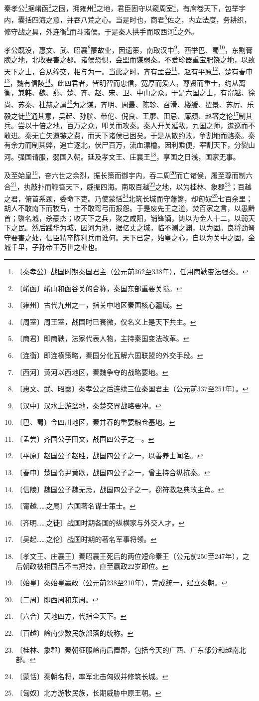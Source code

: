 \documentclass[12pt,UTF-8,openany]{ctexbook}
\begin{document}
\begin{normalsize}
    
    秦孝公\footnote{〔秦孝公〕战国时期秦国君主（公元前362至338年），任用商鞅变法强秦。}据崤函\footnote{〔崤函〕崤山和函谷关的合称，秦国东部重要关隘。}之固，拥雍州\footnote{〔雍州〕古代九州之一，指关中地区秦国核心疆域。}之地，君臣固守以窥周室\footnote{〔周室〕周王室，战国时已衰微，仅名义上是天下共主。}，有席卷天下，包举宇内，囊括四海之意，并吞八荒之心。当是时也，商君\footnote{〔商君〕即商鞅，法家代表人物，主持秦国变法改革。}佐之，内立法度，务耕织，修守战之具，外连衡\footnote{〔连衡〕即连横策略，秦国分化瓦解六国联盟的外交手段。}而斗诸侯。于是秦人拱手而取西河\footnote{〔西河〕黄河以西地区，秦魏争夺的战略要地。}之外。
    
    孝公既没，惠文、武、昭襄\footnote{〔惠文、武、昭襄〕秦孝公之后连续三位秦国君主（公元前337至251年）。}蒙故业，因遗策，南取汉中\footnote{〔汉中〕汉水上游盆地，秦楚交界战略要冲。}，西举巴、蜀\footnote{〔巴、蜀〕今四川地区，秦并吞的重要粮仓基地。}，东割膏腴之地，北收要害之郡。诸侯恐惧，会盟而谋弱秦。不爱珍器重宝肥饶之地，以致天下之士，合从缔交，相与为一。当此之时，齐有孟尝\footnote{〔孟尝〕齐国公子田文，战国四公子之一。}，赵有平原\footnote{〔平原〕赵国公子赵胜，战国四公子之一，以善养士闻名。}，楚有春申\footnote{〔春申〕楚国令尹黄歇，战国四公子之一，曾主持合纵抗秦。}，魏有信陵\footnote{〔信陵〕魏国公子魏无忌，战国四公子之一，窃符救赵典故主角。}。此四君者，皆明智而忠信，宽厚而爱人，尊贤而重士，约从离衡，兼韩、魏、燕、楚、齐、赵、宋、卫、中山之众。于是六国之士，有甯越、徐尚、苏秦、杜赫之属\footnote{〔甯越……之属〕六国著名谋士策士。}为之谋，齐明、周最、陈轸、召滑、楼缓、翟景、苏厉、乐毅之徒\footnote{〔齐明……之徒〕战国时期各国的纵横家与外交人才。}通其意，吴起、孙膑、带佗、倪良、王廖、田忌、廉颇、赵奢之伦\footnote{〔吴起……之伦〕战国时期的著名军事将领。}制其兵。尝以十倍之地，百万之众，叩关而攻秦。秦人开关延敌，九国之师，逡巡而不敢进。秦无亡矢遗镞之费，而天下诸侯已困矣。于是从散约败，争割地而赂秦。秦有余力而制其弊，追亡逐北，伏尸百万，流血漂橹。因利乘便，宰割天下，分裂山河。强国请服，弱国入朝。延及孝文王、庄襄王\footnote{〔孝文王、庄襄王〕秦昭襄王死后的两位短命秦王（公元前250至247年），之后朝政被相国吕不韦把持，直至嬴政22岁即位。}，享国之日浅，国家无事。
    
    及至始皇\footnote{〔始皇〕秦始皇嬴政（公元前238至210年），完成统一，建立秦朝。}，奋六世之余烈，振长策而御宇内，吞二周\footnote{〔二周〕即西周和东周。}而亡诸侯，履至尊而制六合\footnote{〔六合〕天地四方，代指全天下。}，执敲扑而鞭笞天下，威振四海。南取百越\footnote{〔百越〕岭南少数民族部落的统称。}之地，以为桂林、象郡\footnote{〔桂林、象郡〕秦朝征服岭南后置郡，包括今天的广西、广东部分和越南北部。}；百越之君，俯首系颈，委命下吏。乃使蒙恬\footnote{〔蒙恬〕秦朝名将，率军北击匈奴并修筑长城。}北筑长城而守藩篱，却匈奴\footnote{〔匈奴〕北方游牧民族，长期威胁中原王朝。}七百余里；胡人不敢南下而牧马，士不敢弯弓而报怨。于是废先王之道，焚百家之言，以愚黔首；隳名城，杀豪杰；收天下之兵，聚之咸阳，销锋镝，铸以为金人十二，以弱天下之民。然后践华为城，因河为池，据亿丈之城，临不测之渊，以为固。良将劲弩守要害之处，信臣精卒陈利兵而谁何。天下已定，始皇之心，自以为关中之固，金城千里，子孙帝王万世之业也。
    

\end{normalsize}
\end{document}
